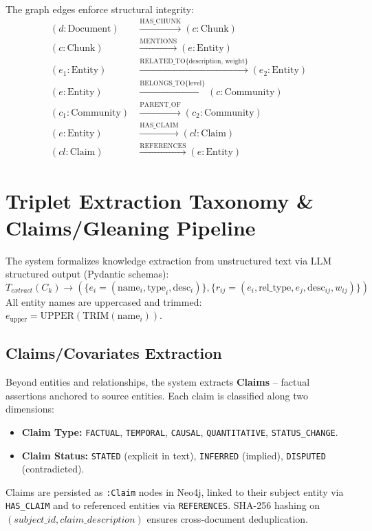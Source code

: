 \documentclass[11pt,a4paper]{report}
\begin{document}
The graph edges enforce structural integrity:
\begin{align}
(d:\text{Document}) &\xrightarrow{\text{HAS\_CHUNK}} (c:\text{Chunk}) \\
(c:\text{Chunk}) &\xrightarrow{\text{MENTIONS}} (e:\text{Entity}) \\
(e_1:\text{Entity}) &\xrightarrow{\text{RELATED\_TO} \{\text{description, weight}\}} (e_2:\text{Entity}) \\
(e:\text{Entity}) &\xrightarrow{\text{BELONGS\_TO} \{\text{level}\}} (c:\text{Community}) \\
(c_1:\text{Community}) &\xrightarrow{\text{PARENT\_OF}} (c_2:\text{Community}) \\
(e:\text{Entity}) &\xrightarrow{\text{HAS\_CLAIM}} (cl:\text{Claim}) \\
(cl:\text{Claim}) &\xrightarrow{\text{REFERENCES}} (e:\text{Entity})
\end{align}

\section{Triplet Extraction Taxonomy \& Claims/Gleaning Pipeline}
The system formalizes knowledge extraction from unstructured text via LLM structured output (Pydantic schemas):
\begin{equation}
T_{extract}(C_k) \to \left( \{e_i = (\text{name}_i, \text{type}_i, \text{desc}_i)\}, \{r_{ij} = (e_i, \text{rel\_type}, e_j, \text{desc}_{ij}, w_{ij})\}\right)
\end{equation}
All entity names are uppercased and trimmed: $e_{\text{upper}} = \text{UPPER}(\text{TRIM}(\text{name}_i))$.

\subsection{Claims/Covariates Extraction}
Beyond entities and relationships, the system extracts \textbf{Claims} -- factual assertions anchored to source entities. Each claim is classified along two dimensions:
\begin{itemize}
    \item \textbf{Claim Type:} \texttt{FACTUAL}, \texttt{TEMPORAL}, \texttt{CAUSAL}, \texttt{QUANTITATIVE}, \texttt{STATUS\_CHANGE}.
    \item \textbf{Claim Status:} \texttt{STATED} (explicit in text), \texttt{INFERRED} (implied), \texttt{DISPUTED} (contradicted).
\end{itemize}
Claims are persisted as \texttt{:Claim} nodes in Neo4j, linked to their subject entity via \texttt{HAS\_CLAIM} and to referenced entities via \texttt{REFERENCES}. SHA-256 hashing on $(subject\_id, claim\_description)$ ensures cross-document deduplication.
\end{document}

